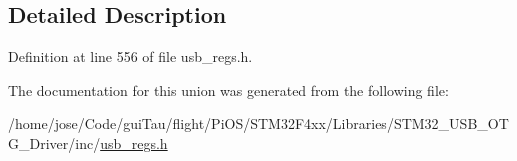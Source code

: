 \subsection{Detailed Description}


Definition at line 556 of file usb\-\_\-regs.\-h.



The documentation for this union was generated from the following file\-:\begin{DoxyCompactItemize}
\item 
/home/jose/\-Code/gui\-Tau/flight/\-Pi\-O\-S/\-S\-T\-M32\-F4xx/\-Libraries/\-S\-T\-M32\-\_\-\-U\-S\-B\-\_\-\-O\-T\-G\-\_\-\-Driver/inc/\hyperlink{_s_t_m32_f4xx_2_libraries_2_s_t_m32___u_s_b___o_t_g___driver_2inc_2usb__regs_8h}{usb\-\_\-regs.\-h}\end{DoxyCompactItemize}
